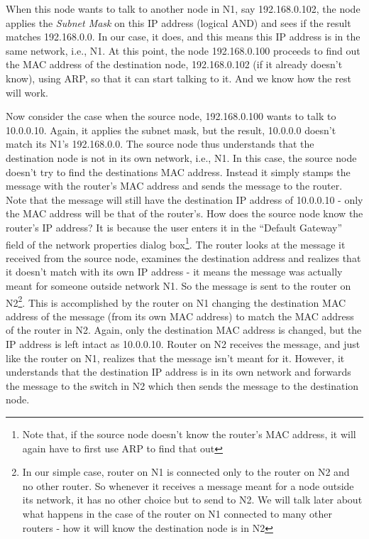 When this node wants to talk to another node in N1, say 192.168.0.102, the node applies the \emph{Subnet Mask} on this IP address (logical AND) and sees if the result matches 192.168.0.0. In our case, it does, and this means this IP address is in the same network, i.e., N1. At this point, the node 192.168.0.100 proceeds to find out the MAC address of the destination node, 192.168.0.102 (if it already doesn't know), using ARP, so that it can start talking to it. And we know how the rest will work.

Now consider the case when the source node, 192.168.0.100 wants to talk to 10.0.0.10. Again, it applies the subnet mask, but the result, 10.0.0.0 doesn't match its N1's 192.168.0.0. The source node thus understands that the destination node is not in its own network, i.e., N1. In this case, the source node doesn't try to find the destinations MAC address. Instead it simply stamps the message with the router's MAC address and sends the message to the router. Note that the message will still have the destination IP address of 10.0.0.10 - only the MAC address will be that of the router's. How does the source node know the router's IP address? It is because the user enters it in the ``Default Gateway'' field of the network properties dialog box\footnote{Note that, if the source node doesn't know the router's MAC address, it will again have to first use ARP to find that out}. The router looks at the message it received from the source node, examines the destination address and realizes that it doesn't match with its own IP address - it means the message was actually meant for someone outside network N1. So the message is sent to the router on N2\footnote{In our simple case, router on N1 is connected only to the router on N2 and no other router. So whenever it receives a message meant for a node outside its network, it has no other choice but to send to N2. We will talk later about what happens in the case of the router on N1 connected to many other routers - how it will know the destination node is in N2}. This is accomplished by the router on N1 changing the destination MAC address of the message (from its own MAC address) to match the MAC address of the router in N2. Again, only the destination MAC address is changed, but the IP address is left intact as 10.0.0.10. Router on N2 receives the message, and just like the router on N1, realizes that the message isn't meant for it. However, it understands that the destination IP address is in its own network and forwards the message to the switch in N2 which then sends the message to the destination node. 

